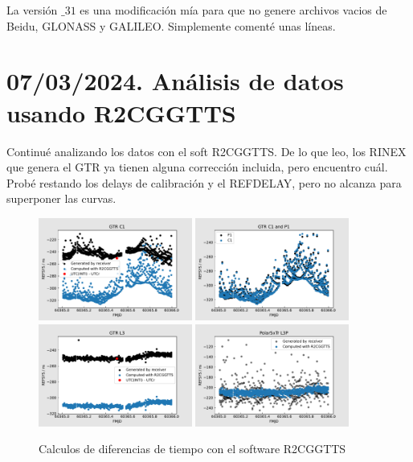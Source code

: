 \documentclass[11pt]{article}
\begin{document}
La versión $\_31$ es una modificación mía para que no genere archivos vacios de Beidu, GLONASS y GALILEO. Simplemente comenté unas líneas.

\section{07/03/2024. Análisis de datos usando R2CGGTTS}

Continué analizando los datos con el soft R2CGGTTS. 
De lo que leo, los RINEX que genera el GTR ya tienen alguna corrección incluida, pero encuentro cuál. Probé restando los delays de calibración y el REFDELAY, pero no alcanza para superponer las curvas.


\begin{figure}[ht]
    \begin{center}
        \includegraphics[width=0.45\textwidth]{./figuras/GTR-C1}
        \includegraphics[width=0.45\textwidth]{./figuras/GTR-C1P1}
        \includegraphics[width=0.45\textwidth]{./figuras/GTR-L3P}
        \includegraphics[width=0.45\textwidth]{./figuras/Polar5xTr-L3P}
        \caption{Calculos de diferencias de tiempo con el software R2CGGTTS}
        \label{fig:Obtencion de archivos CGGTTS a partir re RINEX}
    \end{center}
\end{figure}
\end{document}

